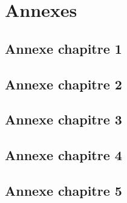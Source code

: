 \chapter*{Annexes}
\section*{Annexe chapitre 1}
\section*{Annexe chapitre 2}
\section*{Annexe chapitre 3}
\section*{Annexe chapitre 4}
\section*{Annexe chapitre 5}
